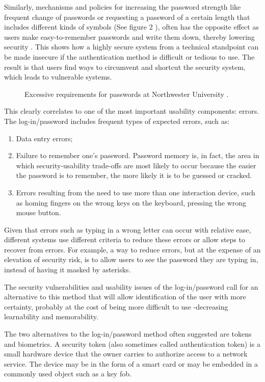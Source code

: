 \documentclass{article}
\begin{document}
Similarly, mechanisms and policies for increasing the password strength like frequent change of passwords or requesting a password of a certain length that includes different kinds of symbols (See figure 2 ), often has the opposite effect as users make easy-to-remember passwords and write them down, thereby lowering security \cite{adams1999users}. This shows how a highly secure system from a technical standpoint can be made insecure if the authentication method is difficult or tedious to use. The result is that users find ways to circumvent and shortcut the security system, which leads to vulnerable systems. 

\begin{figure}
  \centering
  \caption{Excessive requirements for passwords at Northwester University \cite{norman2009way}.}
\end{figure}

This clearly correlates to one of the most important usability components: errors.  The log-in/password includes frequent types of expected errors, such as:
\begin{enumerate}
\item Data entry errors;
\item Failure to remember one's password. Password memory is, in fact, the area in which security-usability trade-offs are most likely to occur because the easier the password is to remember, the more likely it is to be guessed or cracked. 
\item Errors resulting from the need to use more than one interaction device, such as homing fingers on the wrong keys on the keyboard, pressing the wrong mouse button. 
\end{enumerate}

Given that errors such as typing in a wrong letter can occur with relative ease, different systems use different criteria to reduce these errors or allow steps to recover from errors. For example, a way to reduce errors, but at the expense of an elevation of security risk, is to allow users to see the password they are typing in, instead of having it masked by asterisks.

The security vulnerabilities and usability issues of the log-in/password call for an alternative to this method that will allow identification of the user with more certainty, probably at the cost of being more difficult to use -decreasing learnability and memorability.

The two alternatives to the log-in/password method often suggested are tokens and biometrics. A security token (also sometimes called authentication token) is a small hardware device that the owner carries to authorize access to a network service. The device may be in the form of a smart card or may be embedded in a commonly used object such as a key fob. 
\end{document}
